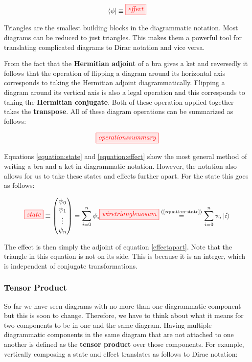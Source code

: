 \documentclass[]{article}
\newcommand{\equaltext}[1]{\ensuremath{\stackrel{\text{#1}}{=}}}
\begin{document}
\begin{equation}
\label{equation:effect}
\bra{\phi} \equiv \tikzfig{effect}
\end{equation}

Triangles are the smallest building blocks in the diagrammatic notation. Most diagrams can be reduced to just triangles. This makes them a powerful tool for translating complicated diagrams to Dirac notation and vice versa.

From the fact that the \textbf{Hermitian adjoint} of a bra gives a ket and reversedly it follows that the operation of flipping a diagram around its horizontal axis corresponds to taking the Hermitian adjoint diagrammatically. Flipping a diagram around its vertical axis is also a legal operation and this corresponds to taking the \textbf{Hermitian conjugate}. Both of these operation applied together takes the \textbf{transpose}. All of these diagram operations can be summarized as follows:

\begin{equation}
\tikzfig{operationssummary}
\end{equation}

Equations \ref{equation:state} and \ref{equation:effect} show the most general method of writing a bra and a ket in diagrammatic notation. However, the notation also allows for us to take these states and effects further apart. For the state this goes as follows: 

\begin{equation}
\label{effectapart}
\tikzfig{state} \equiv
\begin{pmatrix}
\psi_0 \\
\psi_1 \\
\vdots \\
\psi_n
\end{pmatrix} = \sum\limits_{i=0}^{n} \psi_i \tikzfig{wiretrianglenosum} \equaltext{(\ref{equation:state})} \sum\limits_{i=0}^{n} \psi_i \ket{i}
\end{equation}

The effect is then simply the adjoint of equation \ref{effectapart}. Note that the triangle in this equation is not on its side. This is because it is an integer, which is independent of conjugate transformations. 

\subsubsection{Tensor Product}

So far we have seen diagrams with no more than one diagrammatic component but this is soon to change. Therefore, we have to think about what it means for two components to be in one and the same diagram. Having multiple diagrammatic components in the same diagram that are not attached to one another is defined as the \textbf{tensor product} over those components. For example, vertically composing a state and effect translates as follows to Dirac notation:
\end{document}
